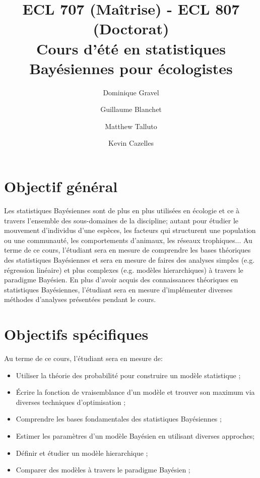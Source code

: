 \documentclass[12]{article}
\title{ECL 707 (Maîtrise) - ECL 807 (Doctorat) \\ Cours d'été en statistiques Bayésiennes pour écologistes}
\date {}
\author[1]{Dominique Gravel}
\author[1]{Guillaume Blanchet}
\author[2]{Matthew Talluto}
\author[3]{Kevin Cazelles}
\affil[1]{Départment de biologie, Université de Sherbrooke}
\affil[2]{Laboratoire d'écologie Alpine, Université Grenoble 1}
\affil[3]{Department of integrative biology, Univeristy of Guelph}
\begin{document}
	\maketitle

	\section*{Objectif général}

  Les statistiques Bayésiennes sont de plus en plus utilisées en écologie et ce à
  travers l'ensemble des sous-domaines de la discipline; autant pour étudier le
  mouvement d'individus d'une espèces, les facteurs qui structurent une
  population ou une communauté, les comportements d'animaux, les réseaux
  trophiques... Au terme de ce cours, l'étudiant sera en mesure de comprendre
  les bases théoriques des statistiques Bayésiennes et sera en mesure de faires
  des analyses simples (e.g. régression linéaire) et plus complexes (e.g.
  modèles hierarchiques) à travers le paradigme Bayésien. En plus d'avoir acquis
  des connaissances théoriques en statistiques Bayésiennes, l'étudiant sera en
  mesure d'implémenter diverses méthodes d'analyses présentées pendant le cours.

	\section*{Objectifs spécifiques}

	Au terme de ce cours, l'étudiant sera en mesure de:

	\begin{itemize}
	\renewcommand{\labelitemi}{$\bullet$}

  \item Utiliser la théorie des probabilité pour construire un modèle statistique ;

  \item Écrire la fonction de vraisemblance d'un modèle et trouver son maximum via diverses techniques d'optimisation ;

  \item Comprendre les bases fondamentales des statistiques Bayésiennes ;

	\item Estimer les paramètres d'un modèle Bayésien en utilisant diverses approches;

	\item Définir et étudier un modèle hierarchique ;

	\item Comparer des modèles à travers le paradigme Bayésien ;

	\end{itemize}
\end{document}
